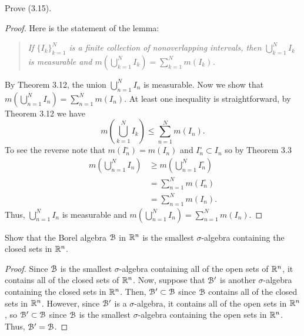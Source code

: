 \begin{problem}
  Prove (3.15).
\end{problem}
\begin{proof}
  Here is the statement of the lemma:
  \begin{quote}
    \emph{If ${\{I_k\}}_{k=1}^{N}$ is a finite collection of nonoverlapping
      intervals, then $\bigcup_{k=1}^NI_k$ is measurable and
      $m\left(\bigcup_{k=1}^NI_k\right)=\sum_{k=1}^Nm(I_k)$.}
  \end{quote}
  By Theorem 3.12, the union $\bigcup_{n=1}^N I_n$ is measurable. Now we
  show that $m\left(\bigcup_{n=1}^NI_n\right)=\sum_{n=1}^Nm(I_n)$. At least
  one inequality is straightforward, by Theorem 3.12 we have
  \[
    m\left(\bigcup_{k=1}^N I_k\right)\leq\sum_{n=1}^Nm(I_n).
  \]
  To see the reverse note that $m(I_n^\circ)=m(I_n)$ and
  $I_n^\circ\subset I_n$ so by Theorem 3.3
  \begin{align*}
    m\left(\bigcup_{n=1}^NI_n\right)
    &\geq m\left(\bigcup_{n=1}^NI_n^\circ\right)\\
    &=\sum_{n=1}^Nm(I_n^\circ)\\
    &=\sum_{n=1}^Nm(I_n).
  \end{align*}
  Thus, $\bigcup_{n=1}^N I_n$ is measurable and
  $m\left(\bigcup_{n=1}^NI_n\right)=\sum_{n=1}^Nm(I_n)$.
\end{proof}

\begin{problem}
  Show that the Borel algebra $\mathcal{B}$ in $\mathbb{R}^n$ is the smallest
  $\sigma$-algebra containing the closed sets in $\mathbb{R}^n$.
\end{problem}
\begin{proof}
  Since $\mathcal{B}$ is the smallest $\sigma$-algebra containing all of the open
  sets of $\mathbb{R}^n$, it contains all of the closed sets of $\mathbb{R}^n$. Now,
  suppose that $\mathcal{B}'$ is another $\sigma$-algebra containing the closed
  sets in $\mathbb{R}^n$. Then, $\mathcal{B}'\subset\mathcal{B}$ since $\mathcal{B}$ contains all
  of the closed sets in $\mathbb{R}^n$. However, since $\mathcal{B}'$ is a
  $\sigma$-algebra, it contains all of the open sets in $\mathbb{R}^n$, so
  $\mathcal{B}'\subset\mathcal{B}$ since $\mathcal{B}$ is the smallest $\sigma$-algebra
  containing the open sets in $\mathbb{R}^n$. Thus, $\mathcal{B}'=\mathcal{B}$.
\end{proof}

